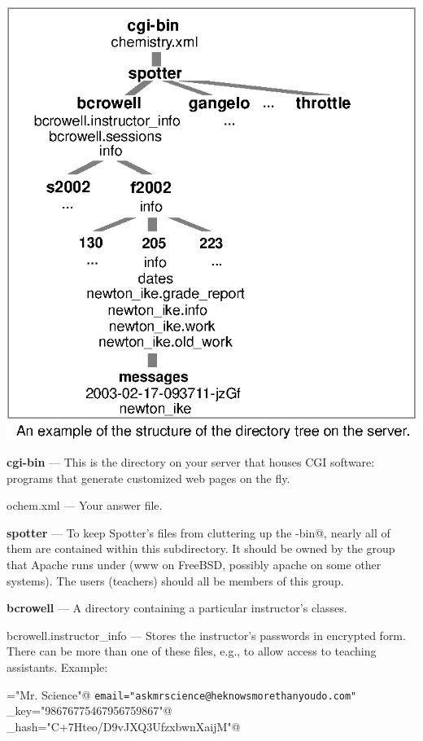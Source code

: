 \documentclass{doc}
\begin{document}
\noindent\includegraphics{doc_figs/filetree}\label{interfacing}

\newcommand{\dir}[1]{\noindent\textbf{#1} --- }
\newcommand{\file}[1]{\noindent{}#1 --- }

\dir{cgi-bin} This is the directory on your server that houses CGI software:
programs that generate customized web pages on the fly.

\file{ochem.xml} Your answer file.

\dir{spotter} To keep Spotter's files from cluttering up the \verb@cgi-bin@,
nearly all of them are contained within this subdirectory. It should be owned
by the group that Apache runs under (www on FreeBSD, possibly apache on some
other systems). The users (teachers) should all be members of this group.

\dir{bcrowell} A directory containing a particular instructor's classes.

\file{bcrowell.instructor\_info} Stores the instructor's passwords in encrypted form.
There can be more than one of these files, e.g., to allow access to teaching assistants.
Example:

\verb@name="Mr. Science"@
\verb+email="askmrscience@heknowsmorethanyoudo.com"+
\verb@server_key="98676775467956759867"@\\
\verb@password_hash="C+7Hteo/D9vJXQ3UfzxbwnXaijM"@
\end{document}
